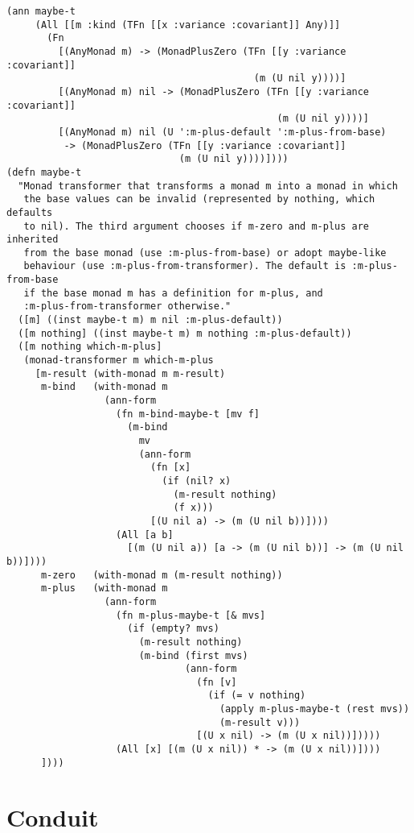 \begin{lstlisting}[caption={Maybe monad transformer in Typed Clojure}, label=lst:maybet]
(ann maybe-t
     (All [[m :kind (TFn [[x :variance :covariant]] Any)]]
       (Fn 
         [(AnyMonad m) -> (MonadPlusZero (TFn [[y :variance :covariant]]
                                           (m (U nil y))))]
         [(AnyMonad m) nil -> (MonadPlusZero (TFn [[y :variance :covariant]]
                                               (m (U nil y))))]
         [(AnyMonad m) nil (U ':m-plus-default ':m-plus-from-base)
          -> (MonadPlusZero (TFn [[y :variance :covariant]]
                              (m (U nil y))))])))
(defn maybe-t
  "Monad transformer that transforms a monad m into a monad in which
   the base values can be invalid (represented by nothing, which defaults
   to nil). The third argument chooses if m-zero and m-plus are inherited
   from the base monad (use :m-plus-from-base) or adopt maybe-like
   behaviour (use :m-plus-from-transformer). The default is :m-plus-from-base
   if the base monad m has a definition for m-plus, and
   :m-plus-from-transformer otherwise."
  ([m] ((inst maybe-t m) m nil :m-plus-default))
  ([m nothing] ((inst maybe-t m) m nothing :m-plus-default))
  ([m nothing which-m-plus]
   (monad-transformer m which-m-plus
     [m-result (with-monad m m-result)
      m-bind   (with-monad m
                 (ann-form
                   (fn m-bind-maybe-t [mv f]
                     (m-bind
                       mv
                       (ann-form
                         (fn [x]
                           (if (nil? x)
                             (m-result nothing) 
                             (f x)))
                         [(U nil a) -> (m (U nil b))])))
                   (All [a b]
                     [(m (U nil a)) [a -> (m (U nil b))] -> (m (U nil b))])))
      m-zero   (with-monad m (m-result nothing))
      m-plus   (with-monad m
                 (ann-form
                   (fn m-plus-maybe-t [& mvs]
                     (if (empty? mvs)
                       (m-result nothing)
                       (m-bind (first mvs)
                               (ann-form
                                 (fn [v]
                                   (if (= v nothing)
                                     (apply m-plus-maybe-t (rest mvs))
                                     (m-result v)))
                                 [(U x nil) -> (m (U x nil))]))))
                   (All [x] [(m (U x nil)) * -> (m (U x nil))])))
      ])))

\end{lstlisting}

\section{Conduit}


